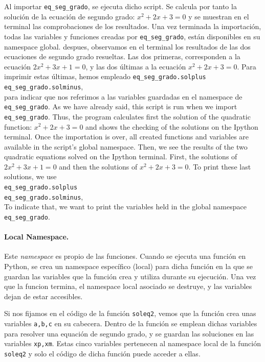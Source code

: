 \begin{paracol}{2}
Al importar \texttt{eq_seg_grado}, se ejecuta dicho script. Se calcula por tanto la solución de la ecuación de segundo grado: $x^2+2x+3=0$ y se muestran en el terminal las comprobaciones de los resultados. Una vez terminada la importación, todas las variables y funciones creadas por \texttt{eq_seg_grado}, están disponibles en su namespace global. despues, observamos en el terminal los resultados de las dos ecuaciones de segundo grado resueltas. Las dos primeras, corresponden a la ecuación $2x^2+3x+1=0$, y las dos últimas a la ecuación $x^2+2x+3=0$. Para imprimir estas últimas, hemos empleado \texttt{eq_seg_grado.solplus}\\
\texttt{eq_seg_grado.solminus},\\ 
para indicar que nos referimos a las variables guardadas en el namespace de \texttt{eq_seg_grado}.
\switchcolumn
As we have already said, this script is run when we import \texttt{eq_seg_grado}. Thus, the program calculates first the solution of the quadratic function: $x^2+2x+3=0$ and shows the checking of the solutions on the Ipython terminal. Once the importation is over, all created functions and variables are available in the script's global namespace. Then, we see the results of the two quadratic equations solved on the Ipython terminal. First, the solutions of    $2x^2+3x+1=0$ and then the solutions of $x^2+2x+3=0$. To print these last solutions, we use\\
\texttt{eq_seg_grado.solplus}\\ 
\texttt{eq_seg_grado.solminus},\\
To indicate that, we want to print the variables held in the global namespace \texttt{eq_seg_grado}.  

\switchcolumn
\paragraph{Local Namespace.} Este \emph{namespace} es propio de las funciones. Cuando se ejecuta una función en Python, se crea un  namespace específico (local)  para dicha función en la que se guardan las variables que la función crea y utiliza durante su ejecución. Una vez que la funcion termina, el namespace local asociado se destruye, y las variables dejan de estar accesibles.

Si nos fijamos en el código de la función \texttt{soleq2}, vemos que la función crea unas variables \texttt{a,b,c} en su cabecera. Dentro de la función se emplean dichas variables para resolver una equación de segundo grado, y se guardan las soluciones en las variables \texttt{xp,xm}. Estas cinco variables pertenecen al namespace local de la función \texttt{soleq2} y solo el código de dicha función puede acceder a ellas.


\end{paracol}
